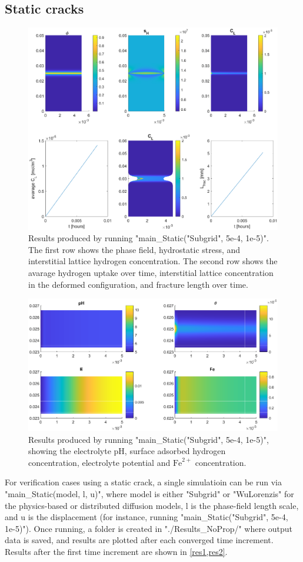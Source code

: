 \documentclass[3p]{elsarticle} %
\begin{document}
\subsection{Static cracks}
\begin{figure}
	\centering
	\includegraphics[width=16cm]{./Figures/Res_Static2.eps}
	\caption{Results produced by running "main{\_}Static("Subgrid", 5e-4, 1e-5)". The first row shows the phase field, hydrostatic stress, and interstitial lattice hydrogen concentration. The second row shows the avarage hydrogen uptake over time, interstitial lattice concentration in the deformed configuration, and fracture length over time.}
	\label{res1}
\end{figure}
\begin{figure}
	\centering
	\includegraphics[width=12cm]{./Figures/Res_Static1.eps}
	\caption{Results produced by running "main{\_}Static("Subgrid", 5e-4, 1e-5)", showing the electrolyte pH, surface adsorbed hydrogen concentration, electrolyte potential and $\mathrm{Fe}^{2+}$ concentration.}
	\label{res2}
\end{figure}
For verification cases using a static crack, a single simulatioin can be run via "main{\_}Static(model, l, u)", where model is either "Subgrid" or "WuLorenzis" for the physics-based or distributed diffusion models, l is the phase-field length scale, and u is the displacement (for instance, running "main{\_}Static("Subgrid", 5e-4, 1e-5)"). Once running, a folder is created in "./Results{\_}NoProp/" where output data is saved, and results are plotted after each converged time increment. Results after the first time increment are shown in \cref{res1,res2}. 
\end{document}
